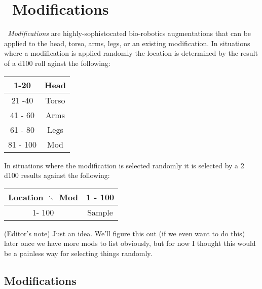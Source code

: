 \section{\cybert\ Modifications}\label{sec:cybr_mods}
\emph{\cybert\ Modifications} are highly-sophistocated bio-robotics augmentations that can be applied to the head, torso, arms, legs, or an existing modification. In situations where a modification is applied randomly the location is determined by the result of a d100 roll aginst the following:
\begin{center}
\begin{tabular}{c | c}
1-20 & Head \\
\hline
21 -40 & Torso \\
\hline
41 - 60 & Arms \\
\hline
61 - 80 & Legs \\
\hline
81 - 100 & Mod \\
\end{tabular}
\end{center}

In situations where the modification is selected randomly it is selected by a 2 d100 results against the following:
\begin{center}
\begin{tabular}{c | c}
Location $\ddots$ Mod & 1 - 100 \\
\hline
1- 100 & Sample
\end{tabular}
\end{center}
(Editor's note) Just an idea. We'll figure this out (if we even want to do this) later once we have more mods to list obviously, but for now I thought this would be a painless way for selecting things randomly.
\subsection*{Modifications}
\begin{multicols}{2}
\end{multicols}
